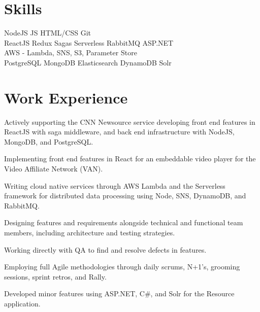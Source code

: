 \documentclass[]{deedy-resume-openfont}
\begin{document}
\begin{minipage}[t]{0.66\textwidth} 


\section{Skills}
NodeJS \textbullet{} JS \textbullet{} HTML/CSS \textbullet{} Git \\
ReactJS \textbullet{} Redux \textbullet{} Sagas \textbullet{} Serverless \textbullet{} RabbitMQ \textbullet{} ASP.NET\\
AWS - Lambda, SNS, S3, Parameter Store\\
PostgreSQL \textbullet{} MongoDB \textbullet{} Elasticsearch \textbullet{} DynamoDB \textbullet{} Solr\\
\sectionsep


\section{Work Experience}
\vspace{\topsep} %
\begin{tightemize}
\item Actively supporting the CNN Newsource service developing front end features in ReactJS with saga middleware, and back end infrastructure with NodeJS, MongoDB, and PostgreSQL. 
\item Implementing front end features in React for an embeddable video player for the Video Affiliate Network (VAN).
\item Writing cloud native services through AWS Lambda and the Serverless framework for distributed data processing using Node, SNS, DynamoDB, and RabbitMQ.
\item Designing features and requirements alongside technical and functional team members, including architecture and testing strategies.
\item Working directly with QA to find and resolve defects in features.
\item Employing full Agile methodologies through daily scrums, N+1's, grooming sessions, sprint retros, and Rally.
\item Developed minor features using ASP.NET, C\#, and Solr for the Resource application.
\end{tightemize}
\sectionsep


\end{minipage}
\end{document}
